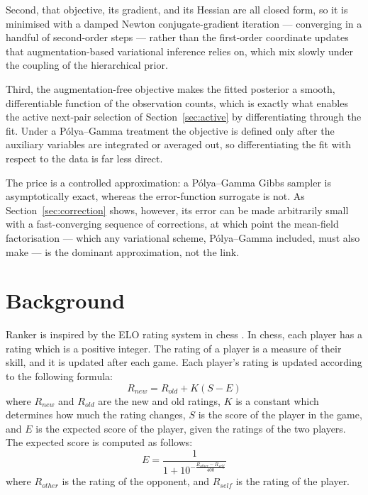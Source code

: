 \documentclass[12pt]{article}
\begin{document}
    Second, that objective, its gradient, and its Hessian are all closed form, so it is minimised
    with a damped Newton conjugate-gradient iteration --- converging in a handful of second-order
    steps --- rather than the first-order coordinate updates that augmentation-based variational
    inference relies on, which mix slowly under the coupling of the hierarchical prior.

    Third, the augmentation-free objective makes the fitted posterior a smooth, differentiable
    function of the observation counts, which is exactly what enables the active next-pair selection
    of Section~\ref{sec:active} by differentiating through the fit. Under a P\'olya--Gamma treatment
    the objective is defined only after the auxiliary variables are integrated or averaged out, so
    differentiating the fit with respect to the data is far less direct.

    The price is a controlled approximation: a P\'olya--Gamma Gibbs sampler is asymptotically exact,
    whereas the error-function surrogate is not. As Section~\ref{sec:correction} shows, however, its
    error can be made arbitrarily small with a fast-converging sequence of corrections, at which point
    the mean-field factorisation --- which any variational scheme, P\'olya--Gamma included, must also
    make --- is the dominant approximation, not the link.

\section{Background}
    Ranker is inspired by the ELO rating system in chess \cite{elo1978rating}. In chess, each
    player has a rating which is a positive integer. The rating of a player is a measure of their
    skill, and it is updated after each game. Each player's rating is updated according to the
    following formula:
    \begin{equation}
        R_{new} = R_{old} + K(S - E)
    \end{equation}
    where $R_{new}$ and $R_{old}$ are the new and old ratings, $K$ is a constant which
    determines how much the rating changes, $S$ is the score of the player in the game, and
    $E$ is the expected score of the player, given the ratings of the two players. The expected
    score is computed as follows:
    \begin{equation}
        E = \frac{1}{1 + 10^{-\frac{R_{other} - R_{self}}{400}}}
    \end{equation}
    where $R_{other}$ is the rating of the opponent, and $R_{self}$ is the rating of the player.
\end{document}

